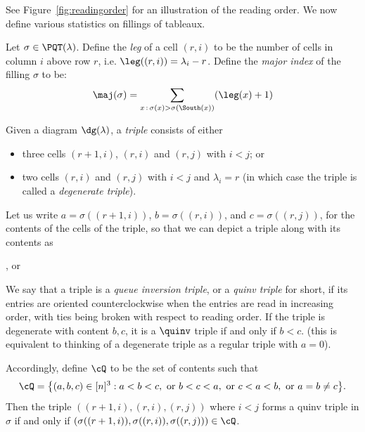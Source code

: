 See Figure~\ref{fig:readingorder} for an illustration of the reading order.
We now define various statistics on fillings of tableaux. 

\begin{defn}\label{def:maj}
Let $\sigma\in\PQT(\lambda)$. Define the \emph{leg} of a cell $(r,i)$ to be the number of cells in column $i$ above row $r$, i.e. $\leg((r,i))= \lambda_i - r$. Define the \emph{major index} of the filling $\sigma$ to be:
\[
\maj(\sigma) = \sum_{x\,:\,\sigma(x)>\sigma(\South(x))} (\leg(x)+1)
\]
\end{defn}


\begin{defn}\label{def:quinv}
Given a diagram $\dg(\lambda)$, a \emph{triple} consists of either
\begin{itemize}
\item three cells $(r+1,i)$, $(r,i)$ and $(r,j)$ with $i<j$; or
\item two cells $(r,i)$ and $(r,j)$ with $i<j$ and  $\lambda_i = r$
(in which case the triple is called a \emph{degenerate triple}).
\end{itemize}
Let us write $a=\sigma((r+1 ,i))$, $b=\sigma((r,i))$, and $c=\sigma((r,j))$, 
for the contents of the cells of the triple, so that we can 
depict a triple along with its contents as
\begin{center}
, \qquad or \qquad {}
\end{center}

We say that a triple is a \emph{queue inversion triple},
or a \emph{quinv triple} for short,
if its entries are oriented counterclockwise when the entries are read in increasing order, with ties being broken with respect to reading order. If the triple is degenerate with content $b,c$, it is a $\quinv$ triple if and only if $b<c$. 
(this is equivalent to thinking of a degenerate triple as a regular triple with $a=0$).
\end{defn}

Accordingly, define $\cQ$ to be the set of contents such that 
\begin{equation}
\label{cQdef}
\cQ=\big\{(a,b,c)\in[n]^3:
a<b<c,
\text{ or } b<c<a,
\text{ or } c<a<b,
\text{ or } a=b\ne c \big\}.
\end{equation}
Then the triple $((r+1,i),(r,i),(r,j))$ where $i<j$ forms a quinv triple in $\sigma$ if and only if $(\sigma((r+1,i)),\sigma((r,i)),\sigma((r,j)))\in \cQ$.

